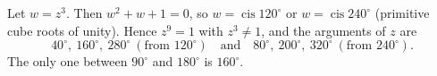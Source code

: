 Let $w=z^3$. Then $w^2+w+1=0$, so $w=\operatorname{cis}120^\circ$ or $w=\operatorname{cis}240^\circ$ (primitive cube roots of unity). Hence $z^9=1$ with $z^3\ne1$, and the arguments of $z$ are
\[40^\circ,\ 160^\circ,\ 280^\circ\ (\text{from }120^\circ)\quad\text{and}\quad 80^\circ,\ 200^\circ,\ 320^\circ\ (\text{from }240^\circ).\]
The only one between $90^\circ$ and $180^\circ$ is $\boxed{160^\circ}$.
